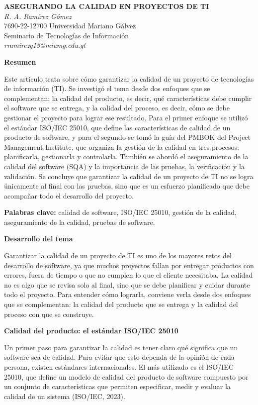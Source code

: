 \documentclass[12pt,letterpaper]{article}
\newcommand{\subtitulo}[1]{\vspace{12pt}\noindent\textbf{#1}\par\vspace{10pt}}
\begin{document}
\begin{center}
\textbf{ASEGURANDO LA CALIDAD EN PROYECTOS DE TI}\\[8pt]
\textit{R. A. Ramírez Gómez}\\
7690-22-12700 Universidad Mariano Gálvez\\
Seminario de Tecnologías de Información\\
\textit{rramirezg18@miumg.edu.gt}
\end{center}

\vspace{10pt}

\subtitulo{Resumen}
Este artículo trata sobre cómo garantizar la calidad de un proyecto de tecnologías de información (TI). Se investigó el tema desde dos enfoques que se complementan: la calidad del producto, es decir, qué características debe cumplir el software que se entrega, y la calidad del proceso, es decir, cómo se debe gestionar el proyecto para lograr ese resultado. Para el primer enfoque se utilizó el estándar ISO/IEC 25010, que define las características de calidad de un producto de software, y para el segundo se tomó la guía del PMBOK del Project Management Institute, que organiza la gestión de la calidad en tres procesos: planificarla, gestionarla y controlarla. También se abordó el aseguramiento de la calidad del software (SQA) y la importancia de las pruebas, la verificación y la validación. Se concluye que garantizar la calidad de un proyecto de TI no se logra únicamente al final con las pruebas, sino que es un esfuerzo planificado que debe acompañar todo el desarrollo del proyecto.

\noindent\textbf{Palabras clave:} calidad de software, ISO/IEC 25010, gestión de la calidad, aseguramiento de la calidad, pruebas de software.

\subtitulo{Desarrollo del tema}
Garantizar la calidad de un proyecto de TI es uno de los mayores retos del desarrollo de software, ya que muchos proyectos fallan por entregar productos con errores, fuera de tiempo o que no cumplen lo que el cliente necesitaba. La calidad no es algo que se revisa solo al final, sino que se debe planificar y cuidar durante todo el proyecto. Para entender cómo lograrla, conviene verla desde dos enfoques que se complementan: la calidad del producto que se entrega y la calidad del proceso con que se construye.

\subtitulo{Calidad del producto: el estándar ISO/IEC 25010}
Un primer paso para garantizar la calidad es tener claro qué significa que un software sea de calidad. Para evitar que esto dependa de la opinión de cada persona, existen estándares internacionales. El más utilizado es el ISO/IEC 25010, que define un modelo de calidad del producto de software compuesto por un conjunto de características que permiten especificar, medir y evaluar la calidad de un sistema (ISO/IEC, 2023).
\end{document}
